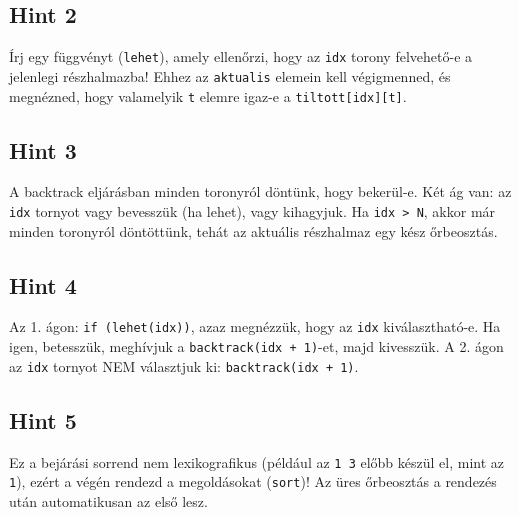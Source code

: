 \documentclass[12pt,a4paper]{article}
\begin{document}
\subsection*{Hint 2}
Írj egy függvényt (\texttt{lehet}), amely ellenőrzi, hogy az \texttt{idx} torony felvehető-e a jelenlegi részhalmazba! Ehhez az \texttt{aktualis} elemein kell végigmenned, és megnézned, hogy valamelyik \texttt{t} elemre igaz-e a \texttt{tiltott[idx][t]}.

\subsection*{Hint 3}
A backtrack eljárásban minden toronyról döntünk, hogy bekerül-e. Két ág van: az \texttt{idx} tornyot vagy bevesszük (ha lehet), vagy kihagyjuk. Ha \texttt{idx > N}, akkor már minden toronyról döntöttünk, tehát az aktuális részhalmaz egy kész őrbeosztás.

\subsection*{Hint 4}
Az 1. ágon: \texttt{if (lehet(idx))}, azaz megnézzük, hogy az \texttt{idx} kiválasztható-e. Ha igen, betesszük, meghívjuk a \texttt{backtrack(idx + 1)}-et, majd kivesszük. A 2. ágon az \texttt{idx} tornyot NEM választjuk ki: \texttt{backtrack(idx + 1)}.

\subsection*{Hint 5}
Ez a bejárási sorrend nem lexikografikus (például az \texttt{1 3} előbb készül el, mint az \texttt{1}), ezért a végén rendezd a megoldásokat (\texttt{sort})! Az üres őrbeosztás a rendezés után automatikusan az első lesz.
\end{document}
